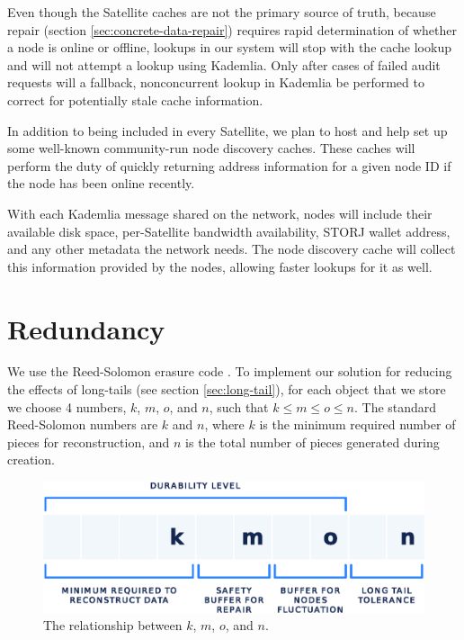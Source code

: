 \documentclass[8pt,fleqn,openany]{book}
\begin{document}
Even though the Satellite caches are not the primary source of truth, because repair
(section \ref{sec:concrete-data-repair}) requires rapid determination of
whether a node is online or offline, lookups in our system will stop with the
cache lookup and will not attempt a lookup using Kademlia.
Only after cases of failed audit requests will a fallback, nonconcurrent
lookup in Kademlia
be performed to correct for potentially stale cache information.

In addition to being included in every Satellite,
we plan to host and help set up some well-known community-run node discovery caches.
These caches will perform the duty of quickly returning address information
for a given node ID if the node has been online recently.

With each Kademlia message shared on the network, nodes will include their
available disk space, per-Satellite bandwidth availability,
STORJ wallet address, and any other metadata the network needs.
The node discovery cache will collect this information provided by the nodes,
allowing faster lookups for it as well.

\section{Redundancy}\label{sec:concrete-redundancy}

We use the Reed-Solomon erasure code \cite{rs}.
To implement our solution for reducing the effects of long-tails (see section
\ref{sec:long-tail}), for each object that we store
we choose 4 numbers, $k$, $m$, $o$, and $n$, such that $k\le m\le o\le n$.
The standard Reed-Solomon numbers are $k$ and $n$, where $k$ is the minimum
required number of pieces for reconstruction, and $n$ is the total number of
pieces generated during creation.

\begin{figure}[!htbp]
\centering
\includegraphics[width=.8\textwidth]{images/kmon.eps}
\caption{The relationship between $k$, $m$, $o$, and $n$.}
\end{figure}
\end{document}
